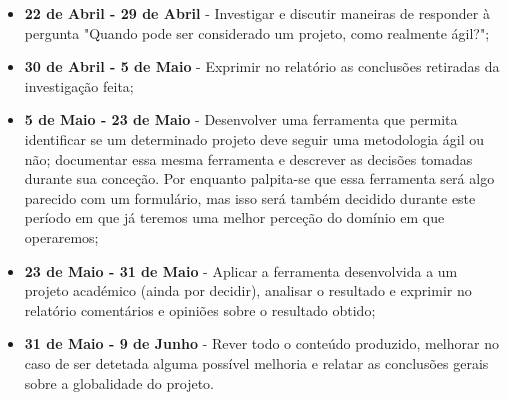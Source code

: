 \begin{itemize}
    \item \textbf{22 de Abril - 29 de Abril} - Investigar e discutir maneiras de responder à pergunta "Quando pode ser considerado um projeto, como realmente ágil?";
    
    \item \textbf{30 de Abril - 5 de Maio} - Exprimir no relatório as conclusões retiradas da investigação feita;
    
    \item \textbf{5 de Maio - 23 de Maio} - Desenvolver uma ferramenta que permita identificar se um determinado projeto deve seguir uma metodologia ágil ou não; documentar essa mesma ferramenta e descrever as decisões tomadas durante sua conceção. Por enquanto palpita-se que essa ferramenta será algo parecido com um formulário, mas isso será também decidido durante este período em que já teremos uma melhor perceção do domínio em que operaremos;
    
    \item \textbf{23 de Maio - 31 de Maio} - Aplicar a ferramenta desenvolvida a um projeto académico (ainda por decidir), analisar o resultado e exprimir no relatório comentários e opiniões sobre o resultado obtido;
    
    \item \textbf{31 de Maio - 9 de Junho} - Rever todo o conteúdo produzido, melhorar no caso de ser detetada alguma possível melhoria e relatar as conclusões gerais sobre a globalidade do projeto.
\end{itemize}


